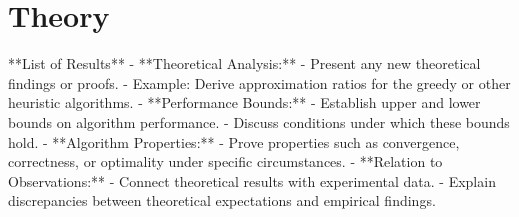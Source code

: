 \chapter{Theory}

\begin{markdown}
**List of Results**
- **Theoretical Analysis:**
  - Present any new theoretical findings or proofs.
  - Example: Derive approximation ratios for the greedy or other heuristic algorithms.
- **Performance Bounds:**
  - Establish upper and lower bounds on algorithm performance.
  - Discuss conditions under which these bounds hold.
- **Algorithm Properties:**
  - Prove properties such as convergence, correctness, or optimality under specific
    circumstances.
- **Relation to Observations:**
  - Connect theoretical results with experimental data.
  - Explain discrepancies between theoretical expectations and empirical findings.
\end{markdown}